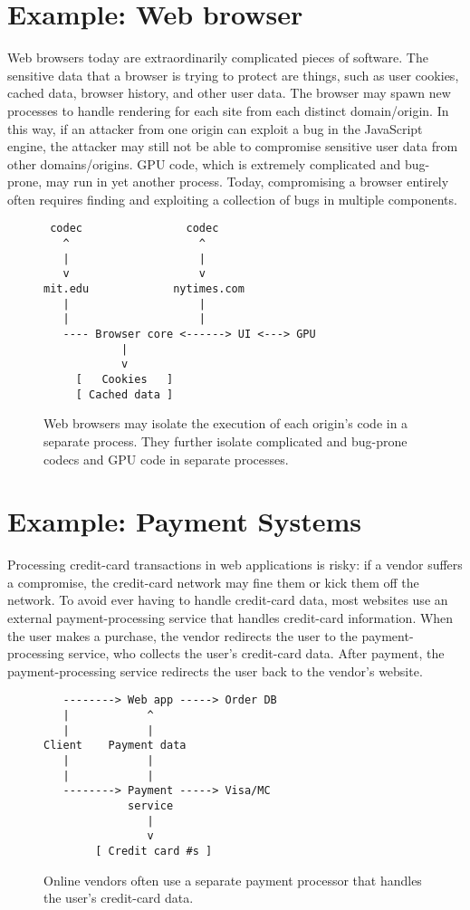 \section{Example: Web browser}

Web browsers today are extraordinarily complicated pieces of software.
The sensitive data that a browser is trying to protect are things, such as
user cookies, cached data, browser history, and other user data.
The browser may spawn new processes to handle rendering for each site
from each distinct domain/origin.
In this way, if an attacker from one origin can exploit a bug in the
JavaScript engine, the attacker may still not be able to compromise
sensitive user data from other domains/origins.
GPU code, which is extremely complicated and bug-prone, may run in 
yet another process.
Today, compromising a browser entirely often requires finding and exploiting
a collection of bugs in multiple components.
\begin{figure}
\begin{verbatim}
 codec                codec
   ^                    ^
   |                    |
   v                    v
mit.edu             nytimes.com
   |                    |
   |                    | 
   ---- Browser core <------> UI <---> GPU
            |
            v
     [   Cookies   ]
     [ Cached data ]
\end{verbatim}
\caption{Web browsers may isolate the execution of each origin's 
  code in a separate process. They further isolate complicated
  and bug-prone codecs and GPU code in separate processes.}
\end{figure}

\section{Example: Payment Systems}
Processing credit-card transactions in web applications is risky:
if a vendor suffers a compromise, the credit-card network may fine
them or kick them off the network.
To avoid ever having to handle credit-card data, most websites 
use an external payment-processing service that handles credit-card information.
When the user makes a purchase, the vendor redirects the user to the 
payment-processing service, who collects the user's credit-card data.
After payment, the payment-processing service redirects the user
back to the vendor's website.

\begin{figure}
\begin{verbatim}
   --------> Web app -----> Order DB
   |            ^
   |            |
Client    Payment data 
   |            |
   |            |
   --------> Payment -----> Visa/MC
             service   
                | 
                v
        [ Credit card #s ]
\end{verbatim}
\caption{Online vendors often use a separate payment processor
    that handles the user's credit-card data.}
\end{figure}
